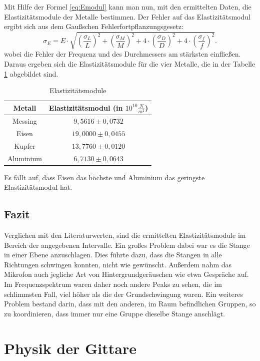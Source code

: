 \documentclass[a4paper, 11pt]{article}
\begin{document}
\noindent Mit Hilfe der Formel \ref{eq:Emodul} kann man nun, mit den ermittelten Daten, die Elastizitätsmodule der Metalle bestimmen. Der Fehler auf das Elastizitätsmodul ergibt sich aus dem Gaußschen Fehlerfortpflanzungsgesetz:
\begin{equation}
\sigma_E = E \cdot \sqrt{\left(\frac{\sigma_L}{L}\right)^2 + \left(\frac{\sigma_M}{M}\right)^2 + 4 \cdot \left(\frac{\sigma_D}{D}\right)^2 + 4 \cdot \left(\frac{\sigma_f}{f}\right)^2}.
\end{equation} 
wobei die Fehler der Frequenz und des Durchmessers am stärksten einfließen.
Daraus ergeben sich die Elastizitätsmodule für die vier Metalle, die in der Tabelle \ref{Tabelle 3} abgebildet sind.  

\begin{table}[H]
\centering
\large
\renewcommand{\arraystretch}{1.2}
\begin{tabular}{|c|c|}
\hline Metall & Elastizitätsmodul (in $10^{10} \frac{N}{m^2}$) \\
\hline Messing & $9,5616 \pm 0,0732$ \\
Eisen & $19,0000 \pm 0,0455$ \\
Kupfer & $13,7760 \pm 0,0120$ \\
Aluminium & $6,7130 \pm 0,0643$ \\
\hline
\end{tabular}
\caption{Elastizitätsmodule}
\label{Tabelle 3}
\end{table}

Es fällt auf, dass Eisen das höchste und Aluminium das geringste Elastizitätsmodul hat.

\subsection{Fazit}
Verglichen mit den Literaturwerten, sind die ermittelten Elastizitätsmodule im Bereich der angegebenen Intervalle. Ein großes Problem dabei war es die Stange in einer Ebene anzuschlagen. Dies führte dazu, dass die Stangen in alle Richtungen schwingen konnten, nicht wie gewünscht. Außerdem nahm das Mikrofon auch jegliche Art von Hintergrundgeräuschen wie etwa Gespräche auf. Im Frequenzspektrum waren daher noch andere Peaks zu sehen, die im schlimmsten Fall, viel höher als die der Grundschwingung waren. 
Ein weiteres Problem bestand darin, dass mit den anderen, im Raum befindlichen Gruppen, so zu koordinieren, dass immer nur eine Gruppe dieselbe Stange anschlägt.

\newpage
\section{Physik der Gittare}
\end{document}
